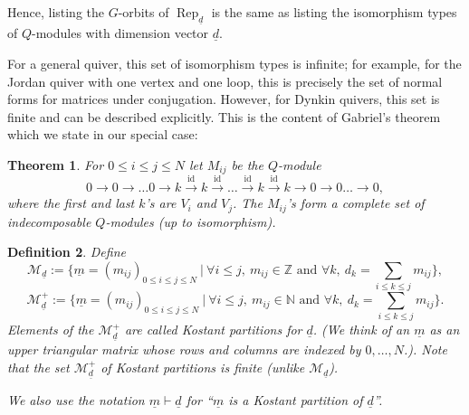 \documentclass[a4paper]{amsart}
\DeclareMathOperator{\id}{id}
\DeclareMathOperator{\Rep}{\mathrm{Rep}}
\newcommand{\Z}{\mathbb{Z}}
\newcommand{\N}{\mathbb{N}}
\newcommand{\CM}{\mathcal{M}}
\newcommand{\um}{\underline{m}}
\newcommand{\ud}{\underline{d}}
\newtheorem{thm}{Theorem}[section]
\newtheorem{defn}[thm]{Definition}
\theoremstyle{plain}
\begin{document}
Hence, listing the $G$-orbits of $\Rep_{\ud}$ is the same as listing the isomorphism types of $Q$-modules with dimension vector $\ud$. 

For a general quiver, this set of isomorphism types is infinite; for example, for the Jordan quiver with one vertex and one loop, this is precisely the set of normal forms for matrices under conjugation. However, for Dynkin quivers, this set is finite and can be described explicitly. This is the content of Gabriel's theorem which we state in our special case:

\begin{thm} \label{thm:type_A_indecomp}
    For $0\leq i \leq j \leq N$ let $M_{ij}$ be the $Q$-module
    \[
    0 \to 0 \to \ldots 0 \to 
    k \xrightarrow{\id} k \xrightarrow{\id} \ldots \xrightarrow{\id} 
    k
    \xrightarrow{\id} k \to 0 \to 0 \ldots 
    \to 0,
    \]
    where the first and last $k$'s are $V_i$ and $V_j$. The $M_{ij}$'s form a complete set of indecomposable $Q$-modules (up to isomorphism). 
\end{thm}


\begin{defn}
        Define 
\[
\CM_{\ud}:=\{\um=(m_{ij})_{0\leq i\leq j\leq N}\ |\ \forall i\leq j,\ m_{ij}\in \Z\text{ and }\forall k,\ d_k=\sum_{i\leq k\leq j} m_{ij}\},
\]
\[
\CM^+_{\ud}:=\{\um=(m_{ij})_{0\leq i\leq j\leq N}\ |\ \forall i\leq j,\ m_{ij}\in \N\text{ and }\forall k,\ d_k=\sum_{i\leq k\leq j} m_{ij}\}.
\]
Elements of the $\CM^+_{\ud}$ are called {\em Kostant partitions} for $\ud$. (We think of an $\um$ as an upper triangular matrix whose rows and columns are indexed by $0,\ldots,N$.). Note that the set $\CM^+_{\ud}$ of Kostant partitions is finite (unlike $\CM_{\ud}$).

We also use the notation $\um \vdash \ud$ for ``$\um$ is a Kostant partition of $\ud$''.
\end{defn}
\end{document}
